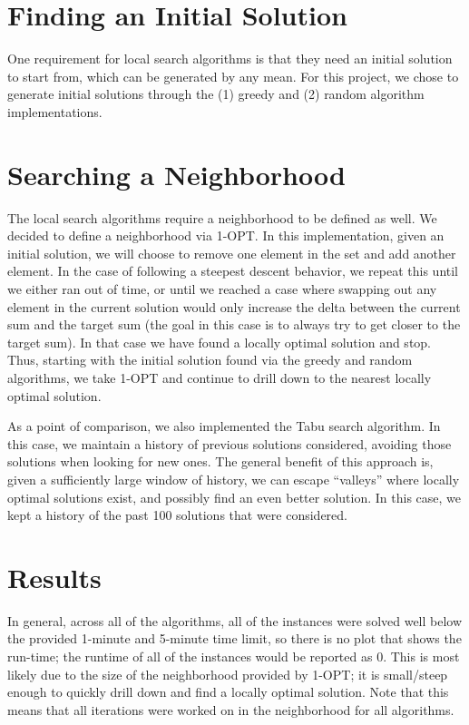 \documentclass{report}
\begin{document}
\section{Finding an Initial Solution}
One requirement for local search algorithms is that they need an initial solution to start from, which
can be generated by any mean. For this project, we chose to generate initial
solutions through the (1) greedy and (2) random algorithm implementations.

\section{Searching a Neighborhood}
The local search algorithms require a neighborhood to be defined as well. We decided to define a neighborhood
via 1-OPT. In this implementation, given an initial solution, we will choose to remove one element in the set
and add another element. In the case of following a steepest descent behavior, we repeat this until we
either ran out of time, or until we reached a case where swapping out any element in the current solution
would only increase the delta between the current sum and the target sum (the goal in this case is to always try to
get closer to the target sum). In that case we have found a locally
optimal solution and stop. Thus, starting with the initial solution found via the greedy and random
algorithms, we take 1-OPT and continue to drill down to the nearest locally optimal solution.

As a point of comparison, we also implemented the Tabu search algorithm. In this case, we maintain a history
of previous solutions considered, avoiding those solutions when looking for new ones. The general
benefit of this approach is, given a sufficiently large window of history, we can escape ``valleys''
where locally optimal solutions exist, and possibly find an even better solution. In this case,
we kept a history of the past 100 solutions that were considered.

\section{Results}
In general, across all of the algorithms, all of the instances were solved well below the provided 1-minute
and 5-minute time limit, so there is no plot that shows the run-time; the runtime of all of the instances would be
reported as 0. This is most likely due to the size of the neighborhood provided by 1-OPT; it is small/steep enough
to quickly drill down and find a locally optimal solution. Note that this means that all iterations were worked on in
the neighborhood for all algorithms.
\end{document}

